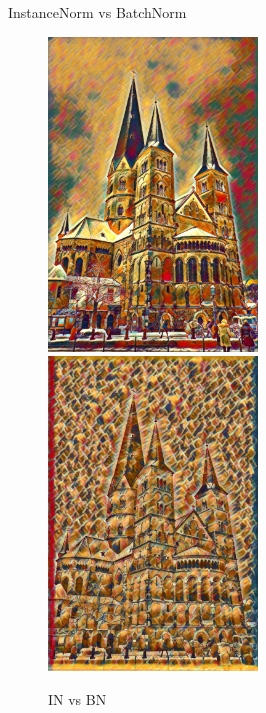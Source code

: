 \documentclass{beamer}
\begin{document}
    \begin{frame}{InstanceNorm vs BatchNorm}

        \begin{figure}
            \includegraphics[width=0.495\textwidth, height=0.7\textheight]{mu_compo}
            \hfill
            \includegraphics[width=0.495\textwidth, height=0.7\textheight]{mu_compo_bn}
            \caption{\label{fig:clutter}IN vs BN}
        \end{figure}

    \end{frame}
\end{document}
